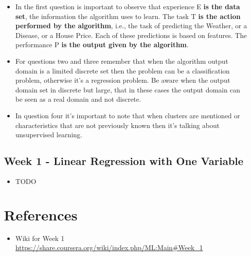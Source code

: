 \documentclass[a4paper]{article}
\begin{document}
\begin{itemize}
\item In the first question is important to observe that experience E \textbf{is the data set}, the information the algorithm uses to learn. The task T \textbf{is the action performed by the algorithm}, i.e., the task of predicting the Weather, or a Disease, or a House Price. Each of these predictions is based on features. The performance P \textbf{is the output given by the algorithm}.
\item For questions two and three remember that when the algorithm output domain is a limited discrete set then the problem can be a classification problem, otherwise it's a regression problem. Be aware when the output domain set in discrete but large, that in these cases the output domain can be seen as a real domain and not discrete.
\item In question four it's important to note that when clusters are mentioned or characteristics that are not previously known then it's talking about unsupervised learning.
\end{itemize}

\subsection{Week 1 - Linear Regression with One Variable}

\begin{itemize}
\item TODO
\end{itemize}

\section{References}

\begin{itemize}
\item Wiki for Week 1\: \url{
https://share.coursera.org/wiki/index.php/ML:Main\#Week\_1}
\end{itemize}
\end{document}
